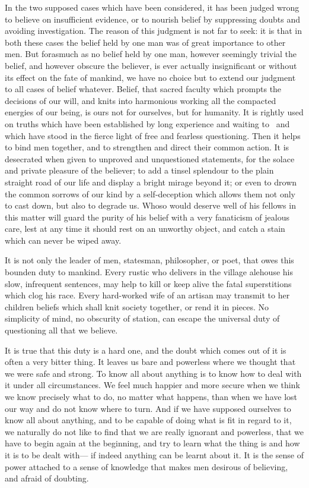 \documentclass[12pt]{article}
\begin{document}
In the two supposed cases which have been considered, it has been judged wrong to believe on insufficient evidence, or to nourish belief by suppressing doubts and avoiding investigation. The reason of this judgment is not far to seek: it is that in both these cases the belief held by one man was of great importance to other men. But forasmuch as no belief held by one man, however seemingly trivial the belief, and however obscure the believer, is ever actually insignificant or without its effect on the fate of mankind, we have no choice but to extend our judgment to all cases of belief whatever. Belief, that sacred faculty which prompts the decisions of our will, and knits into harmonious working all the compacted energies of our being, is ours not for ourselves, but for humanity. It is rightly used on truths which have been established by long experience and waiting to~ and which have stood in the fierce light of free and fearless questioning. Then it helps to bind men together, and to strengthen and direct their common action. It is desecrated when given to unproved and unquestioned statements, for the solace and private pleasure of the believer; to add a tinsel splendour to the plain straight road of our life and display a bright mirage beyond it; or even to drown the common sorrows of our kind by a self-deception which allows them not only to cast down, but also to degrade us. Whoso would deserve well of his fellows in this matter will guard the purity of his belief with a very fanaticism of jealous care, lest at any time it should rest on an unworthy object, and catch a stain which can never be wiped away.

It is not only the leader of men, statesman, philosopher, or poet, that owes this bounden duty to mankind. Every rustic who delivers in the village alehouse his slow, infrequent sentences, may help to kill or keep alive the fatal superstitions which clog his race. Every hard-worked wife of an artisan may transmit to her children beliefs which shall knit society together, or rend it in pieces. No simplicity of mind, no obscurity of station, can escape the universal duty of questioning all that we believe.

It is true that this duty is a hard one, and the doubt which comes out of it is often a very bitter thing. It leaves us bare and powerless where we thought that we were safe and strong. To know all about anything is to know how to deal with it under all circumstances. We feel much happier and more secure when we think we know precisely what to do, no matter what happens, than when we have lost our way and do not know where to turn. And if we have supposed ourselves to know all about anything, and to be capable of doing what is fit in regard to it, we naturally do not like to find that we are really ignorant and powerless, that we have to begin again at the beginning, and try to learn what the thing is and how it is to be dealt with--- if indeed anything can be learnt about it. It is the sense of power attached to a sense of knowledge that makes men desirous of believing, and afraid of doubting.
\end{document}
